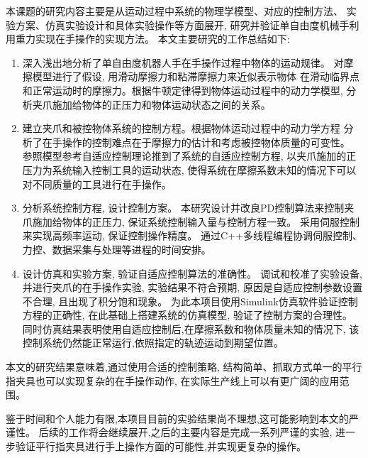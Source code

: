 \begin{conclusion}
本课题的研究内容主要是从运动过程中系统的物理学模型、对应的控制方法、
实验方案、仿真实验设计和具体实验操作等方面展开,
研究并验证单自由度机械手利用重力实现在手操作的实现方法。
本文主要研究的工作总结如下:

\begin{enumerate}[labelsep =.5em, leftmargin = 0pt, itemindent = 3em,  
  itemsep=0pt, partopsep = 0pt, topsep = 5pt, itemsep = 5pt, parsep = 0pt]
  \renewcommand{\labelenumi}{(\theenumi)}
  \item 深入浅出地分析了单自由度机器人手在手操作过程中物体的运动规律。
    对摩擦模型进行了假设, 用滑动摩擦力和粘滞摩擦力来近似表示物体
    在滑动临界点和正常运动时的摩擦力。根据牛顿定律得到物体运动过程中的动力学模型,
    分析夹爪施加给物体的正压力和物体运动状态之间的关系。
  \item 建立夹爪和被控物体系统的控制方程。根据物体运动过程中的动力学方程
    分析了在手操作的控制难点在于摩擦力的估计和考虑被控物体质量的可变性。
    参照模型参考自适应控制理论推到了系统的自适应控制方程, 
    以夹爪施加的正压力为系统输入控制工具的运动状态,
    使得系统在摩擦系数未知的情况下可以对不同质量的工具进行在手操作。
  \item 分析系统控制方程, 设计控制方案。
    本研究设计并改良PD控制算法来控制夹爪施加给物体的正压力, 
    保证系统控制输入量与控制方程一致。
    采用伺服控制来实现高频率运动, 保证控制操作精度。
    通过C++多线程编程协调伺服控制、力控、数据采集与处理等进程的时间安排。
  \item 设计仿真和实验方案, 验证自适应控制算法的准确性。
    调试和校准了实验设备, 并进行夹爪的在手操作实验, 实验结果不符合预期, 
    原因是自适应控制参数设置不合理, 且出现了积分饱和现象。
    为此本项目使用Simulink仿真软件验证控制方程的正确性, 在此基础上搭建系统的仿真模型,
    验证了控制方案的合理性。
    同时仿真结果表明使用自适应控制后,在摩擦系数和物体质量未知的情况下,
    该控制系统仍然能正常运行,依照指定的轨迹运动到期望位置。
\end{enumerate}

本文的研究结果意味着,通过使用合适的控制策略,
结构简单、抓取方式单一的平行指夹具也可以实现复杂的在手操作动作,
在实际生产线上可以有更广阔的应用范围。

鉴于时间和个人能力有限,本项目目前的实验结果尚不理想,这可能影响到本文的严谨性。
后续的工作将会继续展开,之后的主要内容是完成一系列严谨的实验,
进一步验证平行指夹具进行手上操作方面的可能性,并实现更复杂的操作。
    
\end{conclusion}


